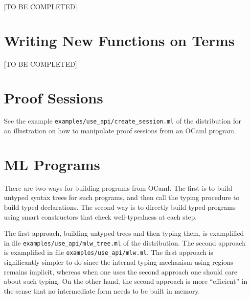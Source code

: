 [TO BE COMPLETED]

\section{Writing New Functions on Terms}

[TO BE COMPLETED]

\section{Proof Sessions}

See the example \verb|examples/use_api/create_session.ml| of the
distribution for an illustration on how to manipulate proof sessions
from an OCaml program.

\section{ML Programs}

There are two ways for building \whyml programs from OCaml. The first
is to build untyped syntax trees for such \whyml programs, and then
call the \why typing procedure to build typed declarations. The second
way is to directly build typed programs using smart constructors that
check well-typedness at each step.

The first approach, building untyped trees and then typing them, is
examplified in file \verb|examples/use_api/mlw_tree.ml| of the
distribution. The second approach is
examplified in file \verb|examples/use_api/mlw.ml|. The first approach
is significantly simpler to do since the internal typing mechanism
using regions remains implicit, whereas when one uses the second
approach one should care about such typing. On the other hand, the
second approach is more ``efficient'' in the sense that no
intermediate form needs to be built in memory.




